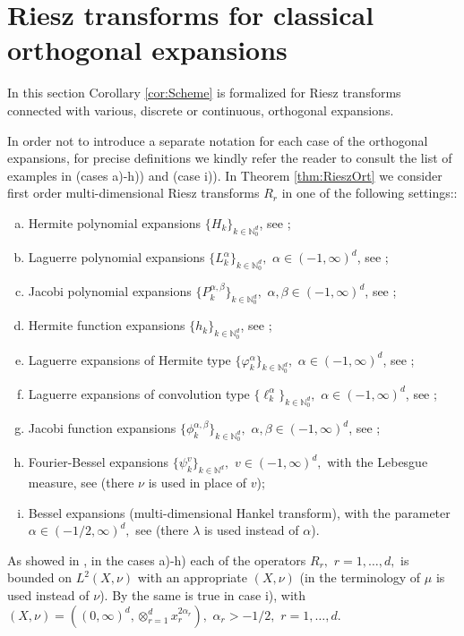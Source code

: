 \documentclass[leqno,12pt]{amsart}
\theoremstyle{definition}
\theoremstyle{remark}
\begin{document}
\section[Riesz transforms for classical orthogonal expansions]{Riesz transforms for classical orthogonal expansions}
\label{sec:ort}
In this section Corollary \ref{cor:Scheme} is formalized for Riesz transforms connected with various, discrete or continuous, orthogonal expansions.

In order not to introduce a separate notation for each case of the orthogonal expansions, for precise definitions we kindly refer the reader to consult the list of examples in \cite[Section 7]{NSRiesz} (cases a)-h)) and \cite{Bet1} (case i)). In Theorem \ref{thm:RieszOrt} we consider first order multi-dimensional Riesz transforms $R_r$ in one of the following settings::
\begin{enumerate}[a)]
\item Hermite polynomial expansions $\{H_{k}\}_{k\in \mathbb{N}_0^d}$, see \cite[Section 7.1]{NSRiesz};
\item Laguerre polynomial expansions $\{L_{k}^{\alpha}\}_{k\in \mathbb{N}_0^d},$ $\alpha\in(-1,\infty)^d$, see \cite[Section 7.2]{NSRiesz};
\item Jacobi polynomial expansions $\{P_{k}^{\alpha,\beta}\}_{k\in \mathbb{N}_0^d},$ $\alpha,\beta\in(-1,\infty)^d$, see \cite[Section 7.3]{NSRiesz};
\item Hermite function expansions $\{h_{k}\}_{k\in \mathbb{N}_0^d}$, see \cite[Section 7.4]{NSRiesz};
\item Laguerre expansions of Hermite type $\{\varphi_{k}^{\alpha}\}_{k\in \mathbb{N}_0^d},$ $\alpha\in(-1,\infty)^d$, see \cite[Section 7.5]{NSRiesz};
\item Laguerre expansions of convolution type $\{\ell_{k}^{\alpha}\}_{k\in \mathbb{N}_0^d},$ $\alpha\in(-1,\infty)^d$, see \cite[Section 7.6]{NSRiesz};
\item Jacobi function expansions $\{\phi_{k}^{\alpha,\beta}\}_{k\in \mathbb{N}_0^d},$ $\alpha,\beta \in(-1,\infty)^d$, see \cite[Section 7.7]{NSRiesz};
\item Fourier-Bessel expansions $\{\psi_{k}^{v}\}_{k\in \mathbb{N}^d},$ $v\in(-1,\infty)^d,$ with the Lebesgue measure, see \cite[Section 7.8]{NSRiesz} (there $\nu$ is used in place of $v$);
\item Bessel expansions (multi-dimensional Hankel transform), with the parameter $\alpha\in (-1/2,\infty)^d,$ see \cite[pp. 946-947]{Bet1} (there $\lambda$ is used instead of $\alpha$).
\end{enumerate}
As showed in \cite{NSRiesz}, in the cases a)-h) each of the operators $R_r,$ $r=1,\ldots,d,$ is bounded on $L^2(X,\nu)$ with an appropriate $(X,\nu)$ (in the terminology of \cite{NSRiesz} $\mu$ is used instead of $\nu$). By \cite[Theorem 1.3]{Bet1} the same is true in case i), with $(X,\nu)=((0,\infty)^d,\otimes_{r=1}^d x_r^{2\alpha_r}),$ $\alpha_r>-1/2,$ $r=1,\ldots,d.$
\end{document}
